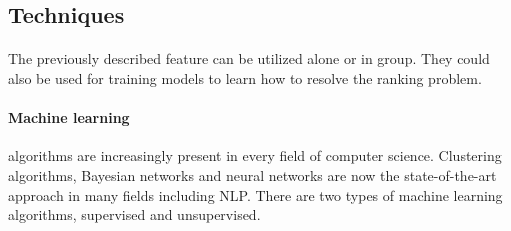 \subsection{Techniques}
\paragraph{} The previously described feature can be utilized alone or in group. They could also be used for training models to learn how to resolve the ranking problem.

\paragraph{Machine learning} algorithms are increasingly present in every field of computer science. Clustering algorithms, Bayesian networks and neural networks are now the state-of-the-art approach in many fields including NLP. There are two types of machine learning algorithms, supervised and unsupervised.

